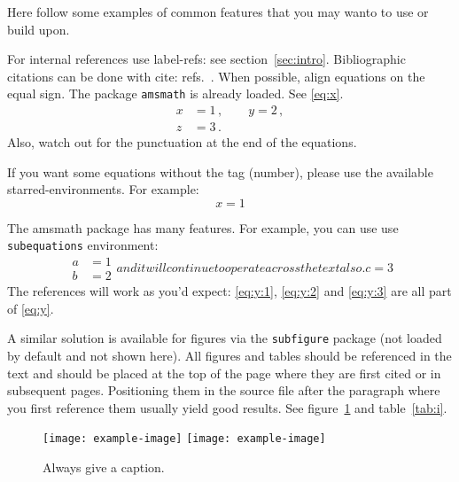\documentclass[a4paper,11pt]{article}
\begin{document}
Here follow some examples of common features that you may wanto to use
or build upon.

For internal references use label-refs: see section~\ref{sec:intro}.
Bibliographic citations can be done with cite: refs.~\cite{a,b,c}.
When possible, align equations on the equal sign. The package
\texttt{amsmath} is already loaded. See \eqref{eq:x}.
\begin{equation}
\label{eq:x}
\begin{split}
x &= 1 \,,
\qquad
y = 2 \,,
\\
z &= 3 \,.
\end{split}
\end{equation}
Also, watch out for the punctuation at the end of the equations.


If you want some equations without the tag (number), please use the available
starred-environments. For example:
\begin{equation*}
x = 1
\end{equation*}

The amsmath package has many features. For example, you can use use
\texttt{subequations} environment:
\begin{subequations}\label{eq:y}
\begin{align}
\label{eq:y:1}
a & = 1
\\
\label{eq:y:2}
b & = 2
\end{align}
and it will continue to operate across the text also.
\begin{equation}
\label{eq:y:3}
c = 3
\end{equation}
\end{subequations}
The references will work as you'd expect: \eqref{eq:y:1},
\eqref{eq:y:2} and \eqref{eq:y:3} are all part of \eqref{eq:y}.

A similar solution is available for figures via the \texttt{subfigure}
package (not loaded by default and not shown here).
All figures and tables should be referenced in the text and should be
placed at the top of the page where they are first cited or in
subsequent pages. Positioning them in the source file
after the paragraph where you first reference them usually yield good
results. See figure~\ref{fig:i} and table~\ref{tab:i}.

\begin{figure}[tbp]
\centering 
\texttt{[image: example-image]}
\hfill
\texttt{[image: example-image]}
\caption{\label{fig:i} Always give a caption.}
\end{figure}
\end{document}
